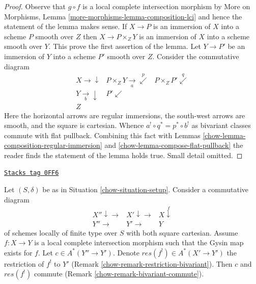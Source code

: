 \begin{proof}

Observe that $g \circ f$ is a local complete intersection morphism
by More on Morphisms, Lemma \ref{more-morphisms-lemma-composition-lci}
and hence the statement of the lemma makes sense.
If $X \to P$ is an immersion of $X$ into a scheme $P$ smooth over $Z$
then $X \to P \times_Z Y$ is an immersion of $X$ into a scheme smooth
over $Y$. This prove the first assertion of the lemma.
Let $Y \to P'$ be an immersion of $Y$ into a scheme $P'$ smooth over $Z$.
Consider the commutative diagram
$$
\begin{array}{ccc}X \longrightarrow\downarrow & P \times_Z Y \underset{a}{\longrightarrow}\overset{p}{\swarrow} & P \times_Z P' \overset{q}{\swarrow} \\ Y \underset{b}{\longrightarrow}\downarrow & P' \swarrow &  \\ Z &  & \end{array}
$$
Here the horizontal arrows are regular immersions, the south-west arrows
are smooth, and the square is cartesian. Whence
$a^! \circ q^* = p^* \circ b^!$ as bivariant classes commute
with flat pullback. Combining this fact with
Lemmas \ref{chow-lemma-composition-regular-immersion} and
\ref{chow-lemma-compose-flat-pullback}
the reader finds the statement of the lemma holds true.
Small detail omitted.
\end{proof}

\begin{lemma}
\label{chow-lemma-lci-gysin-commutes}
\href{https://stacks.math.columbia.edu/tag/0FF6}{\texttt{Stacks tag 0FF6}}

Let $(S, \delta)$ be as in Situation \ref{chow-situation-setup}.
Consider a commutative diagram
$$
\begin{array}{ccc}X'' \downarrow\longrightarrow & X' \downarrow\longrightarrow & X \overset{f}{\downarrow} \\ Y'' \longrightarrow & Y' \longrightarrow & Y\end{array}
$$
of schemes locally of finite type over $S$ with both square cartesian.
Assume $f : X \to Y$ is a local complete intersection morphism
such that the Gysin map exists for $f$. Let $c \in A^*(Y'' \to Y')$. Denote
$res(f^!) \in A^*(X' \to Y')$ the restriction of $f^!$ to $Y'$
(Remark \ref{chow-remark-restriction-bivariant}). Then $c$ and $res(f^!)$ commute
(Remark \ref{chow-remark-bivariant-commute}).
\end{lemma}

